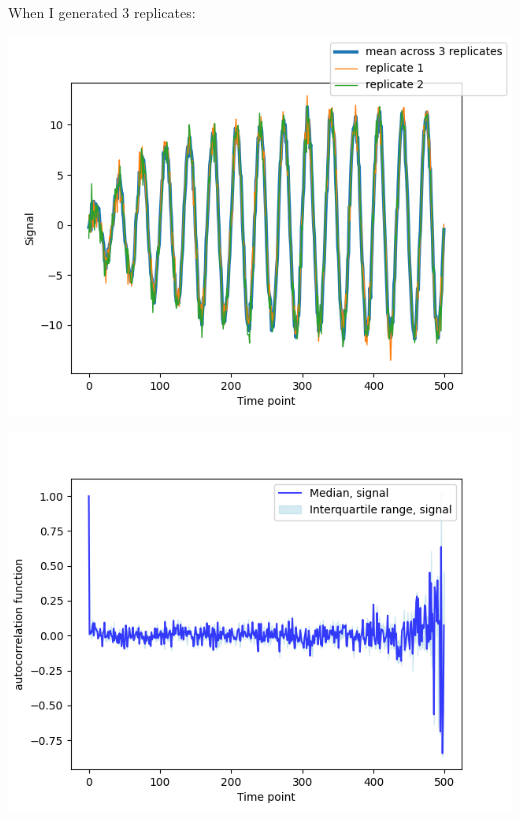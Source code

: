 \begin{enumerate}
\begin{enumerate}
\begin{enumerate}
When I generated 3 replicates:
\begin{center}
\includegraphics[width=.9\linewidth]{nonstat_kmax10_samephase_3rep_mean.png}
\end{center}
\begin{center}
\includegraphics[width=.9\linewidth]{nonstat_kmax10_samephase_3rep_acf.png}
\end{center}


\end{enumerate}
\end{enumerate}
\end{enumerate}

